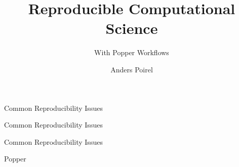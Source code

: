 \documentclass{beamer}
\title{Reproducible Computational Science}
\subtitle{With Popper Workflows}
\author{Anders Poirel}
\date{}
\institute{CROSS 2020 Research Symposium\\ University of California, Santa Cruz}
\begin{document}
\maketitle

\begin{frame}{Common Reproducibility Issues}

\end{frame}

\begin{frame}{Common Reproducibility Issues}

\end{frame}

\begin{frame}{Common Reproducibility Issues}

\end{frame}

\begin{frame}{Popper}

\end{frame}


\begin{frame}

\end{frame}

\begin{frame}

\end{frame}

\begin{frame}

\end{frame}
\end{document}
